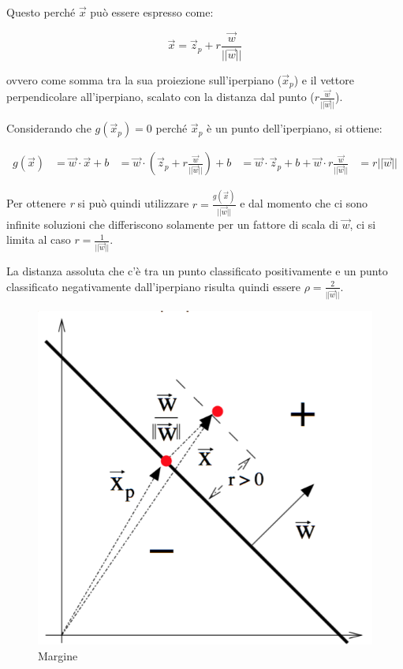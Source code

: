 Questo perché $\vec{x}$ può essere espresso come:

$$ \vec{x} = \vec{z}_p + r\frac{\vec{w}}{||\vec{w}||}$$

ovvero come somma tra la sua proiezione sull'iperpiano ($\vec{x}_p$) e il vettore perpendicolare all'iperpiano, scalato con la distanza dal punto ($r\frac{\vec{w}}{||\vec{w}||}$).

Considerando che $g(\vec{x}_p) = 0$ perché $\vec{x}_p$ è un punto dell'iperpiano, si ottiene:

\begin{align*}
g(\vec{x}) &= \vec{w} \cdot \vec{x} + b
				  &=\vec{w}\cdot (\vec{z}_p + r\frac{\vec{w}}{||\vec{w}||}) + b
				  &=\vec{w}\cdot \vec{z}_p + b + \vec{w}\cdot r\frac{\vec{w}}{||\vec{w}||} 
				  &= r||\vec{w}||
\end{align*}

Per ottenere \textit{r} si può quindi utilizzare $r = \frac{g(\vec{x})}{||\vec{w}||}$ e dal momento che ci sono infinite soluzioni che differiscono solamente per un fattore di scala di $\vec{w}$, ci si limita al caso $r = \frac{1}{||\vec{w}||}$.

La distanza assoluta che c'è tra un punto classificato positivamente e un punto classificato negativamente dall'iperpiano risulta quindi essere $\rho = \frac{2}{||\vec{w}||}$.

\begin{figure}[htbp]
\centering
\includegraphics{./notes/immagini/l12-margine.png}
\caption{Margine}
\end{figure}

